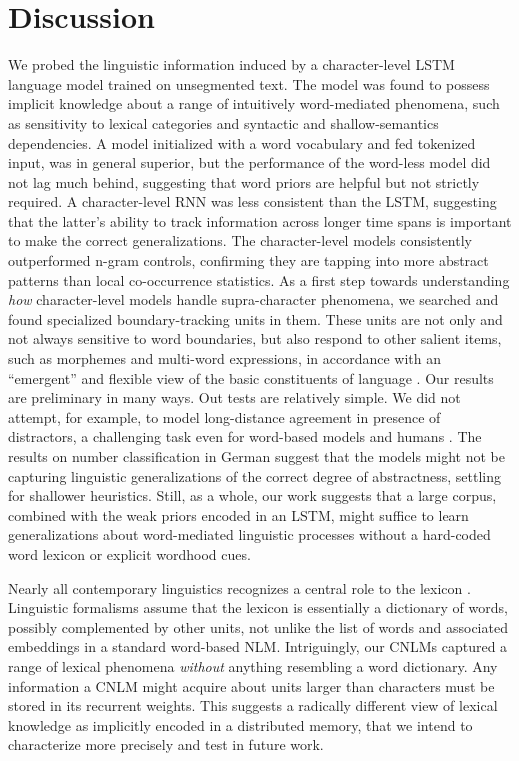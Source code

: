 \section{Discussion}
\label{sec:discussion}

We probed the linguistic information induced by a character-level LSTM
language model trained on unsegmented text. The model was found to
possess implicit knowledge about a range of intuitively word-mediated
phenomena, such as sensitivity to lexical categories and syntactic and
shallow-semantics dependencies. A model initialized with a word
vocabulary and fed tokenized input, was in general superior, but the
performance of the word-less model did not lag much behind, suggesting
that word priors are helpful but not strictly required. A
character-level RNN was less consistent than the LSTM, suggesting that
the latter's ability to track information across longer time
spans is important to make the correct generalizations. The
character-level models consistently outperformed n-gram controls,
confirming they are tapping into more abstract patterns than local
co-occurrence statistics. As a first step towards understanding
\emph{how} character-level models handle supra-character phenomena, we
searched and found specialized boundary-tracking units in them. These
units are not only and not always sensitive to word boundaries, but
also respond to other salient items, such as morphemes and multi-word
expressions, in accordance with an ``emergent'' and flexible view of
the basic constituents of language \cite{Schiering:etal:2010}. Our
results are preliminary in many ways. Out tests are relatively
simple. We did not attempt, for example, to model long-distance
agreement in presence of distractors, a challenging task even for
word-based models and humans \citep{Gulordava:etal:2018}. The results
on number classification in German suggest that the models might not
be capturing linguistic generalizations of the correct degree of
abstractness, settling for shallower heuristics. Still, as a whole,
our work suggests that a large corpus, combined with the weak priors
encoded in an LSTM, might suffice to learn generalizations about
word-mediated linguistic processes without a hard-coded word lexicon
or explicit wordhood cues.

Nearly all contemporary linguistics recognizes a central role to the
lexicon \cite[see, e.g.,][for very different
perspectives]{Sag:etal:2003,Goldberg:2005,Radford:2006,Bresnan:etal:2016,Jezek:2016}. Linguistic
formalisms assume that the lexicon is essentially a dictionary
of words, possibly complemented by other units, not unlike the list of
words and associated embeddings in a standard word-based
NLM. Intriguingly, our CNLMs captured a range of lexical phenomena
\emph{without} anything resembling a word dictionary. Any information
a CNLM might acquire about units larger than characters must be stored
in its recurrent weights. This suggests a radically different view of
lexical knowledge as implicitly encoded in a distributed memory, that
we intend to characterize more precisely and test in future work.

